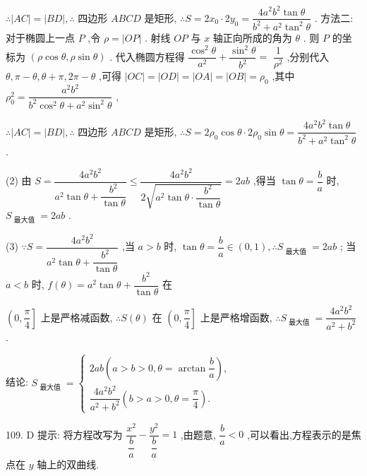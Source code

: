 $\therefore \left| {AC}\right|  = \left| {BD}\right| ,\therefore$ 四边形 ${ABCD}$ 是矩形, $\therefore S = 2{x}_{0} \cdot  2{y}_{0} = \dfrac{4{a}^{2}{b}^{2}\tan \theta }{{b}^{2} + {a}^{2}{\tan }^{2}\theta }$ . 方法二: 对于椭圆上一点 $P$ ,令 $\rho  = \left| {OP}\right|$ . 射线 ${OP}$ 与 $x$ 轴正向所成的角为 $\theta$ . 则 $P$ 的坐标为 $\left( {\rho \cos \theta ,\rho \sin \theta }\right)$ . 代入椭圆方程得 $\dfrac{{\cos }^{2}\theta }{{a}^{2}} + \dfrac{{\sin }^{2}\theta }{{b}^{2}} =$  $\dfrac{1}{{\rho }^{2}}$ ,分别代入 $\theta ,\pi  - \theta ,\theta  + \pi ,{2\pi } - \theta$ ,可得 $\left| {OC}\right|  = \left| {OD}\right|  = \left| {OA}\right|  = \left| {OB}\right|  = {\rho }_{0}$ ,其中 ${\rho }_{0}^{2} = \dfrac{{a}^{2}{b}^{2}}{{b}^{2}{\cos }^{2}\theta  + {a}^{2}{\sin }^{2}\theta }$ ,

$\therefore \left| {AC}\right|  = \left| {BD}\right| ,\therefore$ 四边形 ${ABCD}$ 是矩形, $\therefore S = 2{\rho }_{0}\cos \theta  \cdot  2{\rho }_{0}\sin \theta  = \dfrac{4{a}^{2}{b}^{2}\tan \theta }{{b}^{2} + {a}^{2}{\tan }^{2}\theta }$ .

(2) 由 $S = \dfrac{4{a}^{2}{b}^{2}}{{a}^{2}\tan \theta  + \dfrac{{b}^{2}}{\tan \theta }} \leq  \dfrac{4{a}^{2}{b}^{2}}{2\sqrt{{a}^{2}\tan \theta  \cdot  \dfrac{{b}^{2}}{\tan \theta }}} = {2ab}$ ,得当 $\tan \theta  = \dfrac{b}{a}$ 时, ${S}_{\text{ 最大值 }} = {2ab}$ .

(3) $\because S = \dfrac{4{a}^{2}{b}^{2}}{{a}^{2}\tan \theta  + \dfrac{{b}^{2}}{\tan \theta }}$ ,当 $a > b$ 时, $\tan \theta  = \dfrac{b}{a} \in  \left( {0,1}\right) ,\therefore {S}_{\text{ 最大值 }} = {2ab}$ ; 当 $a < b$ 时, $f\left( \theta \right)  = {a}^{2}\tan \theta  + \dfrac{{b}^{2}}{\tan \theta }$ 在

$\left( {0,\dfrac{\pi }{4}}\right\rbrack$ 上是严格减函数, $\therefore S\left( \theta \right)$ 在 $\left( {0,\dfrac{\pi }{4}}\right\rbrack$ 上是严格增函数, $\therefore {S}_{\text{ 最大值 }} = \dfrac{4{a}^{2}{b}^{2}}{{a}^{2} + {b}^{2}}$ .

结论: ${S}_{\text{ 最大值 }} = \left\{  \begin{array}{l} {2ab}\left( {a > b > 0,\theta  = \arctan \dfrac{b}{a}}\right) , \\  \dfrac{4{a}^{2}{b}^{2}}{{a}^{2} + {b}^{2}}\left( {b > a > 0,\theta  = \dfrac{\pi }{4}}\right) . \end{array}\right.$

109. D 提示: 将方程改写为 $\dfrac{{x}^{2}}{\dfrac{b}{a}} - \dfrac{{y}^{2}}{\dfrac{b}{a}} = 1$ ,由题意, $\dfrac{b}{a} < 0$ ,可以看出,方程表示的是焦点在 $y$ 轴上的双曲线.

